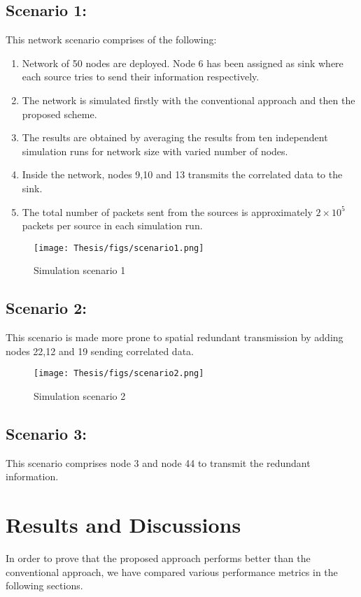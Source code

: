  \subsection{Scenario 1:}
 This network scenario comprises of the following:
 \begin{enumerate}
     \item Network of 50 nodes are deployed. Node 6 has been assigned as sink where each source tries to send their information respectively.
     \item The network is simulated firstly with the conventional approach and then the proposed scheme.
     \item The results are obtained by averaging the results from ten independent simulation runs for network size with varied number of nodes.
      \item Inside the network, nodes 9,10 and 13 transmits the correlated data to the sink.
      \item The total number of packets sent from the sources is approximately $2 \times 10^{5}$ packets per source in each simulation run.
 \end{enumerate}
\begin{figure}[h!]
    \centering
    \texttt{[image: Thesis/figs/scenario1.png]}
    \caption{Simulation scenario 1 }
    \label{fig:my_label}
\end{figure} 
 \subsection{Scenario 2:}
 This scenario is made more prone to spatial redundant transmission by adding nodes 22,12 and 19 sending correlated data.
 \begin{figure}[h!]
    \centering
    \texttt{[image: Thesis/figs/scenario2.png]}
    \caption{Simulation scenario 2 }
    \label{fig:my_label}
\end{figure} 
 \subsection{Scenario 3:}
 This scenario comprises node 3 and node 44 to transmit the redundant information.
\section{Results and Discussions}
In order to prove that the proposed approach performs better than the conventional approach, we have compared various performance metrics in the following sections.
